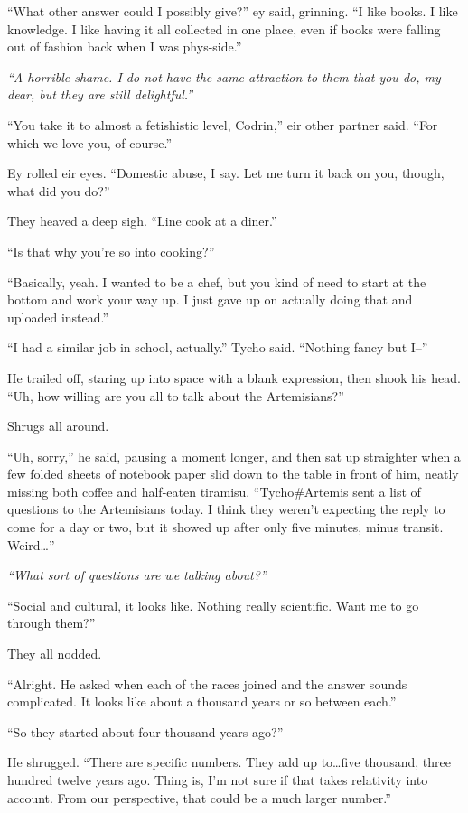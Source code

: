 ``What other answer could I possibly give?'' ey said, grinning. ``I like books. I like knowledge. I like having it all collected in one place, even if books were falling out of fashion back when I was phys-side.''

\emph{``A horrible shame. I do not have the same attraction to them that you do, my dear, but they are still delightful.''}

``You take it to almost a fetishistic level, Codrin,'' eir other partner said. ``For which we love you, of course.''

Ey rolled eir eyes. ``Domestic abuse, I say. Let me turn it back on you, though, what did you do?''

They heaved a deep sigh. ``Line cook at a diner.''

``Is that why you're so into cooking?''

``Basically, yeah. I wanted to be a chef, but you kind of need to start at the bottom and work your way up. I just gave up on actually doing that and uploaded instead.''

``I had a similar job in school, actually.'' Tycho said. ``Nothing fancy but I--''

He trailed off, staring up into space with a blank expression, then shook his head. ``Uh, how willing are you all to talk about the Artemisians?''

Shrugs all around.

``Uh, sorry,'' he said, pausing a moment longer, and then sat up straighter when a few folded sheets of notebook paper slid down to the table in front of him, neatly missing both coffee and half-eaten tiramisu. ``Tycho\#Artemis sent a list of questions to the Artemisians today. I think they weren't expecting the reply to come for a day or two, but it showed up after only five minutes, minus transit. Weird\ldots{}''

\emph{``What sort of questions are we talking about?''}

``Social and cultural, it looks like. Nothing really scientific. Want me to go through them?''

They all nodded.

``Alright. He asked when each of the races joined and the answer sounds complicated. It looks like about a thousand years or so between each.''

``So they started about four thousand years ago?''

He shrugged. ``There are specific numbers. They add up to\ldots five thousand, three hundred twelve years ago. Thing is, I'm not sure if that takes relativity into account. From our perspective, that could be a much larger number.''

